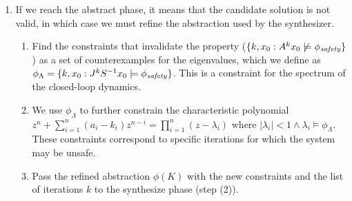 \begin{enumerate}
\item If we reach the {\sc abstract} phase, it means that the candidate solution is not valid,
  in which case we must refine the abstraction used by the synthesizer.
\begin{enumerate}
\item Find the constraints that invalidate the property ($\{ k, x_0 : {A}^k{x}_0 \not \models \phi_\mathit{safety}\}$) as a set of counterexamples for the eigenvalues, which we define as $\phi_\Lambda=\{ k, x_0 : {J}^k{S}^{-1}{x}_0 \models \phi_\mathit{safety}\}$. 
This is a constraint for the spectrum of the closed-loop dynamics.  
\item We use $\phi_\Lambda$ to
  further constrain the characteristic polynomial %
$z^n+\sum_{i=1}^n(a_i-k_i)z^{n-i}=\prod_{i=1}^n (z-\lambda_i) \text{ where } |\lambda_i|<1 \wedge \lambda_i \models \phi_{\Lambda}$. These constraints correspond to specific iterations for which the system may be unsafe.
\item Pass the refined abstraction $\phi(K)$ with the new constraints and the list of iterations $k$ to the {\sc synthesize} phase (step (2)).
\end{enumerate} 
\end{enumerate}


